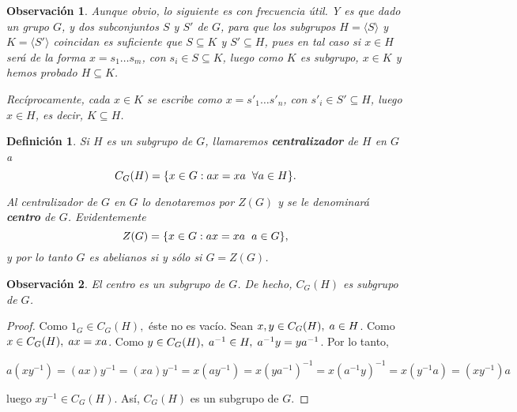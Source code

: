 \documentclass[12pt]{article}
\newtheorem{definition}[theorem]{Definición}
\newtheorem{observation}{Observación}[theorem]
\begin{document}
\begin{observation}Aunque obvio, lo siguiente es con frecuencia útil. Y es que dado un grupo $G$, y dos subconjuntos $S$ y $S'$ de $G$, para que los subgrupos $H = \langle S \rangle$ y $K = \langle S' \rangle$ coincidan es suficiente que $S \subseteq K$ y $S' \subseteq H$, pues en tal caso si $x \in H$ será de la forma $x = s_1 \ldots s_m$, con $s_i \in S \subseteq K$, luego como $K$ es subgrupo, $x \in K$ y hemos probado $H \subseteq K$.

Recíprocamente, cada $x \in K$ se escribe como $x = s'_1 \ldots s'_n$, con $s'_i \in S' \subseteq H$, luego $x \in H$, es decir, $K \subseteq H$.
\end{observation}

\begin{definition}Si $H$ es un subgrupo de $G$, llamaremos \textbf{centralizador} de $H$ en $G$ a $$C_G(H) = \lbrace x \in G : ax = xa \hspace{0.2cm} \forall a \in H \rbrace.$$

Al centralizador de $G$ en $G$ lo denotaremos por $Z(G)$ y se le denominará \textbf{centro} de $G$. Evidentemente $$Z(G) = \lbrace x \in G: ax = xa \hspace{0.2cm} a \in G \rbrace,$$ y por lo tanto $G$ es abelianos si y sólo si $G = Z(G)$.
\end{definition}

\begin{observation}El centro es un subgrupo de $G$. De hecho, $C_G(H)$ es subgrupo de $G$.
\end{observation}
\begin{proof}
Como $1_{G} \in C_{G}(H),$ éste no es vacío. Sean $x,y \in C_{G}(H),\hspace{0.1cm} a \in H$. Como $x\in C_{G}(H),\hspace{0.1cm} ax = xa$. Como $y \in C_{G}(H), \hspace{0.1cm} a^{-1} \in H,\hspace{0.1cm} a^{-1}y = ya^{-1}$. Por lo tanto, \begin{center}$a(xy^{-1}) = (ax)y^{-1} = (xa)y^{-1} = x(ay^{-1}) = x(ya^{-1})^{-1} = x(a^{-1}y)^{-1} = x(y^{-1}a) = (xy^{-1})a$\end{center} luego $xy^{-1} \in C_{G}(H)$. Así, $C_{G}(H)$ es un subgrupo de $G$.

\end{proof}
\end{document}
